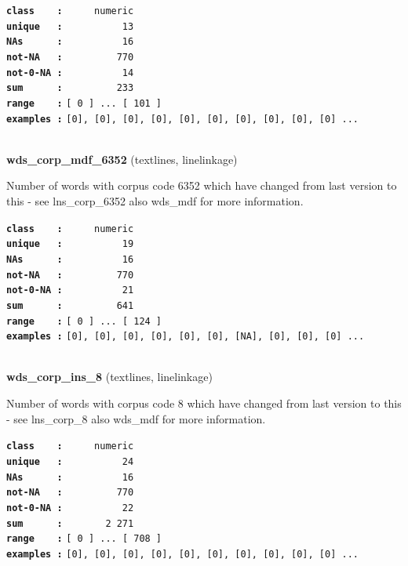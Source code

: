\documentclass[]{article}
\begin{document}
\textbf{\texttt{class\ \ \ \ :}} \texttt{~~~~~numeric}\\
\textbf{\texttt{unique\ \ \ :}} \texttt{~~~~~~~~~~13}\\
\textbf{\texttt{NAs\ \ \ \ \ \ :}} \texttt{~~~~~~~~~~16}\\
\textbf{\texttt{not-NA\ \ \ :}} \texttt{~~~~~~~~~770}\\
\textbf{\texttt{not-0-NA\ :}} \texttt{~~~~~~~~~~14}\\
\textbf{\texttt{sum\ \ \ \ \ \ :}} \texttt{~~~~~~~~~233}\\
\textbf{\texttt{range\ \ \ \ :}}
\texttt{{[}\ 0\ {]}\ ...\ {[}\ 101\ {]}}\\
\textbf{\texttt{examples\ :}}
\texttt{{[}0{]},\ {[}0{]},\ {[}0{]},\ {[}0{]},\ {[}0{]},\ {[}0{]},\ {[}0{]},\ {[}0{]},\ {[}0{]},\ {[}0{]}\ ...}\\

~

\textbf{wds\_corp\_mdf\_6352} (textlines, linelinkage)

Number of words with corpus code 6352 which have changed from last
version to this - see lns\_corp\_6352 also wds\_mdf for more
information.

\textbf{\texttt{class\ \ \ \ :}} \texttt{~~~~~numeric}\\
\textbf{\texttt{unique\ \ \ :}} \texttt{~~~~~~~~~~19}\\
\textbf{\texttt{NAs\ \ \ \ \ \ :}} \texttt{~~~~~~~~~~16}\\
\textbf{\texttt{not-NA\ \ \ :}} \texttt{~~~~~~~~~770}\\
\textbf{\texttt{not-0-NA\ :}} \texttt{~~~~~~~~~~21}\\
\textbf{\texttt{sum\ \ \ \ \ \ :}} \texttt{~~~~~~~~~641}\\
\textbf{\texttt{range\ \ \ \ :}}
\texttt{{[}\ 0\ {]}\ ...\ {[}\ 124\ {]}}\\
\textbf{\texttt{examples\ :}}
\texttt{{[}0{]},\ {[}0{]},\ {[}0{]},\ {[}0{]},\ {[}0{]},\ {[}0{]},\ {[}NA{]},\ {[}0{]},\ {[}0{]},\ {[}0{]}\ ...}\\

~

\textbf{wds\_corp\_ins\_8} (textlines, linelinkage)

Number of words with corpus code 8 which have changed from last version
to this - see lns\_corp\_8 also wds\_mdf for more information.

\textbf{\texttt{class\ \ \ \ :}} \texttt{~~~~~numeric}\\
\textbf{\texttt{unique\ \ \ :}} \texttt{~~~~~~~~~~24}\\
\textbf{\texttt{NAs\ \ \ \ \ \ :}} \texttt{~~~~~~~~~~16}\\
\textbf{\texttt{not-NA\ \ \ :}} \texttt{~~~~~~~~~770}\\
\textbf{\texttt{not-0-NA\ :}} \texttt{~~~~~~~~~~22}\\
\textbf{\texttt{sum\ \ \ \ \ \ :}} \texttt{~~~~~~~2~271}\\
\textbf{\texttt{range\ \ \ \ :}}
\texttt{{[}\ 0\ {]}\ ...\ {[}\ 708\ {]}}\\
\textbf{\texttt{examples\ :}}
\texttt{{[}0{]},\ {[}0{]},\ {[}0{]},\ {[}0{]},\ {[}0{]},\ {[}0{]},\ {[}0{]},\ {[}0{]},\ {[}0{]},\ {[}0{]}\ ...}\\
\end{document}
